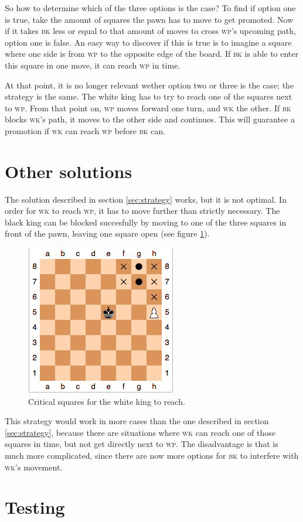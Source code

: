 \documentclass[titlepage,a4paper, 11pt]{article}
\newcommand{\bk}{\textsc{bk}\xspace}
\newcommand{\wk}{\textsc{wk}\xspace}
\renewcommand{\wp}{\textsc{wp}\xspace}
\begin{document}
So how to determine which of the three options is the case? To find if option one is true, take the amount
of squares the pawn has to move to get promoted. Now if it takes \bk less or equal to that amount of moves
to cross \wp's upcoming path, option one is false. An easy way to discover if this is true is to imagine
a square where one side is from \wp to the opposite edge of the board. If \bk is able to enter this square
in one move, it can reach \wp in time.

At that point, it is no longer relevant wether option two or three is the case; the strategy is the same.
The white king has to try to reach one of the squares next to \wp. From that point on, \wp moves forward
one turn, and \wk the other. If \bk blocks \wk's path, it moves to the other side and continues. This
will guarantee a promotion if \wk can reach \wp before \bk can.

\section{Other solutions}
The solution described in section \ref{sec:strategy} works, but it is not optimal. In order for \wk to
reach \wp, it has to move further than strictly necessary. The black king can be blocked succesfully by
moving to one of the three squares in front of the pawn, leaving one square open (see figure 
\ref{fig:keysquares}). 
\begin{figure}[htb]
\centering
\includegraphics{keysquares.png}
\caption{Critical squares for the white king to reach.}
\label{fig:keysquares}
\end{figure}
This strategy would work in more cases than the one described in section
\ref{sec:strategy}, because there are situations where \wk can reach one of those squares in time, but
not get directly next to \wp. The disadvantage is that is much more complicated, since there are now
more options for \bk to interfere with \wk's movement.

\section{Testing}
\end{document}
